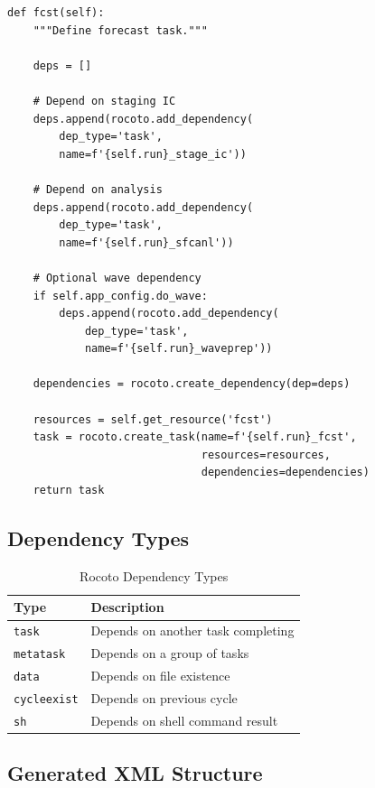 \documentclass[11pt,letterpaper]{article}
\begin{document}
\begin{lstlisting}[style=pythonstyle, title=gfs\_tasks.py (Task Definition Example)]
def fcst(self):
    """Define forecast task."""
    
    deps = []
    
    # Depend on staging IC
    deps.append(rocoto.add_dependency(
        dep_type='task',
        name=f'{self.run}_stage_ic'))
    
    # Depend on analysis
    deps.append(rocoto.add_dependency(
        dep_type='task',
        name=f'{self.run}_sfcanl'))
    
    # Optional wave dependency
    if self.app_config.do_wave:
        deps.append(rocoto.add_dependency(
            dep_type='task',
            name=f'{self.run}_waveprep'))
    
    dependencies = rocoto.create_dependency(dep=deps)
    
    resources = self.get_resource('fcst')
    task = rocoto.create_task(name=f'{self.run}_fcst',
                              resources=resources,
                              dependencies=dependencies)
    return task
\end{lstlisting}

\subsection{Dependency Types}

\begin{table}[H]
\centering
\caption{Rocoto Dependency Types}
\label{tab:dep-types}
\begin{tabular}{@{}ll@{}}
\toprule
\textbf{Type} & \textbf{Description} \\
\midrule
\texttt{task} & Depends on another task completing \\
\texttt{metatask} & Depends on a group of tasks \\
\texttt{data} & Depends on file existence \\
\texttt{cycleexist} & Depends on previous cycle \\
\texttt{sh} & Depends on shell command result \\
\bottomrule
\end{tabular}
\end{table}

\subsection{Generated XML Structure}
\end{document}
